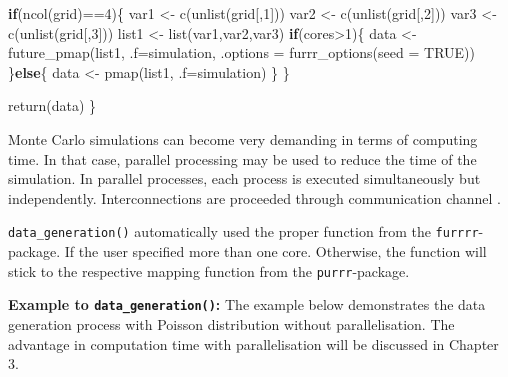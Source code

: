\documentclass[11pt,a4paper]{article}
\newenvironment{Shaded}{\begin{snugshade}}{\end{snugshade}}
\newcommand{\AttributeTok}[1]{\textcolor[rgb]{0.77,0.63,0.00}{#1}}
\newcommand{\ConstantTok}[1]{\textcolor[rgb]{0.00,0.00,0.00}{#1}}
\newcommand{\ControlFlowTok}[1]{\textcolor[rgb]{0.13,0.29,0.53}{\textbf{#1}}}
\newcommand{\DecValTok}[1]{\textcolor[rgb]{0.00,0.00,0.81}{#1}}
\newcommand{\FunctionTok}[1]{\textcolor[rgb]{0.00,0.00,0.00}{#1}}
\newcommand{\NormalTok}[1]{#1}
\newcommand{\OtherTok}[1]{\textcolor[rgb]{0.56,0.35,0.01}{#1}}
\newcommand{\SpecialCharTok}[1]{\textcolor[rgb]{0.00,0.00,0.00}{#1}}
\begin{document}
\begin{Shaded}
\begin{Highlighting}[]
  \ControlFlowTok{if}\NormalTok{(}\FunctionTok{ncol}\NormalTok{(grid)}\SpecialCharTok{==}\DecValTok{4}\NormalTok{)\{}
\NormalTok{    var1 }\OtherTok{\textless{}{-}} \FunctionTok{c}\NormalTok{(}\FunctionTok{unlist}\NormalTok{(grid[,}\DecValTok{1}\NormalTok{]))}
\NormalTok{    var2 }\OtherTok{\textless{}{-}} \FunctionTok{c}\NormalTok{(}\FunctionTok{unlist}\NormalTok{(grid[,}\DecValTok{2}\NormalTok{]))}
\NormalTok{    var3 }\OtherTok{\textless{}{-}} \FunctionTok{c}\NormalTok{(}\FunctionTok{unlist}\NormalTok{(grid[,}\DecValTok{3}\NormalTok{]))}
\NormalTok{    list1 }\OtherTok{\textless{}{-}} \FunctionTok{list}\NormalTok{(var1,var2,var3)}
    \ControlFlowTok{if}\NormalTok{(cores}\SpecialCharTok{\textgreater{}}\DecValTok{1}\NormalTok{)\{}
\NormalTok{      data }\OtherTok{\textless{}{-}} \FunctionTok{future\_pmap}\NormalTok{(list1, }\AttributeTok{.f=}\NormalTok{simulation,}
                          \AttributeTok{.options =} \FunctionTok{furrr\_options}\NormalTok{(}\AttributeTok{seed =} \ConstantTok{TRUE}\NormalTok{))}
\NormalTok{    \}}\ControlFlowTok{else}\NormalTok{\{}
\NormalTok{      data }\OtherTok{\textless{}{-}} \FunctionTok{pmap}\NormalTok{(list1, }\AttributeTok{.f=}\NormalTok{simulation)}
\NormalTok{    \}}
\NormalTok{  \}}
  
  \FunctionTok{return}\NormalTok{(data)}
\NormalTok{\}}
\end{Highlighting}
\end{Shaded}

Monte Carlo simulations can become very demanding in terms of computing
time. In that case, parallel processing may be used to reduce the time
of the simulation. In parallel processes, each process is executed
simultaneously but independently. Interconnections are proceeded through
communication channel \autocite{Czech_2017}.

\texttt{data\_generation()} automatically used the proper function from
the \texttt{furrrr}-package. If the user specified more than one core.
Otherwise, the function will stick to the respective mapping function
from the \texttt{purrr}-package.

\textbf{Example to \texttt{data\_generation()}:} The example below
demonstrates the data generation process with Poisson distribution
without parallelisation. The advantage in computation time with
parallelisation will be discussed in Chapter 3.
\end{document}
